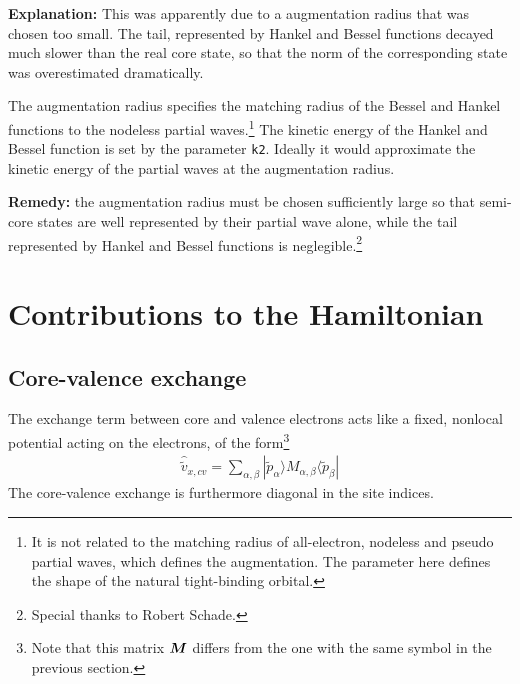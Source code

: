 \documentclass[11pt,a4paper]{report}
\begin{document}
\textbf{Explanation:} This was apparently due to a augmentation radius
that was chosen too small. The tail, represented by Hankel and Bessel
functions decayed much slower than the real core state, so that the
norm of the corresponding state was overestimated dramatically.

The augmentation radius specifies the matching radius of the Bessel
and Hankel functions to the nodeless partial waves.\footnote{It is not
  related to the matching radius of all-electron, nodeless and pseudo
  partial waves, which defines the augmentation. The parameter here
  defines the shape of the natural tight-binding orbital.} The kinetic
energy of the Hankel and Bessel function is set by the parameter
\verb|k2|. Ideally it would approximate the kinetic energy of the
partial waves at the augmentation radius.

\textbf{Remedy:} the augmentation radius must be chosen sufficiently
large so that semi-core states are well represented by their partial
wave alone, while the tail represented by Hankel and Bessel functions
is neglegible.\footnote{Special thanks to Robert Schade.}


\chapter{Contributions to the Hamiltonian}
\section{Core-valence exchange}
The exchange term between core and valence electrons acts like a
fixed, nonlocal potential acting on the electrons, of the
form\footnote{Note that this matrix $\bm{M}$ differs from the one
  with the same symbol in the previous section.}
\begin{eqnarray}
\hat{\tilde{v}}_{x,cv}=\sum_{\alpha,\beta}|\tilde{p}_\alpha\rangle 
M_{\alpha,\beta}\langle\tilde{p}_\beta|
\end{eqnarray}
The core-valence exchange is furthermore diagonal in the site indices.
\end{document}
